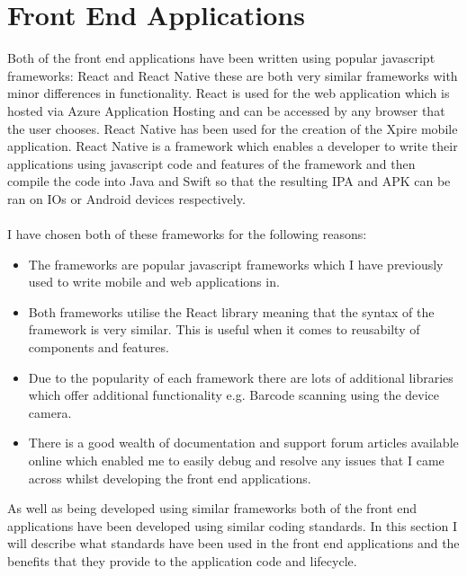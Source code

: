 \documentclass[a4paper,11pt]{report}
\begin{document}
\section{Front End Applications}
Both of the front end applications have been written using popular javascript frameworks: React and React 
Native these are both very similar frameworks with minor differences in functionality. React is used for 
the web application which is hosted via Azure Application Hosting and can be accessed by any browser that
the user chooses. React Native has been used for the creation of the Xpire mobile application. React Native
is a framework which enables a developer to write their applications using javascript code and features of
the framework and then compile the code into Java and Swift so that the resulting IPA and APK can be ran 
on IOs or Android devices respectively.
\\
\\
I have chosen both of these frameworks for the following reasons:
\begin{itemize}
    \item The frameworks are popular javascript frameworks which I have previously used to write mobile and web applications in.
    \item Both frameworks utilise the React library meaning that the syntax of the framework is very similar. This is useful 
    when it comes to reusabilty of components and features. 
    \item Due to the popularity of each framework there are lots of additional libraries which offer additional functionality
     e.g. Barcode scanning using the device camera.
    \item There is a good wealth of documentation and support forum articles available online which enabled me to easily debug 
    and resolve any issues that I came across whilst developing the front end applications.
\end{itemize}

As well as being developed using similar frameworks both of the front end applications have been developed using similar coding standards.
 In this section I will describe what standards have been used in the front end applications and the benefits that they provide to the application code and lifecycle.
\end{document}

